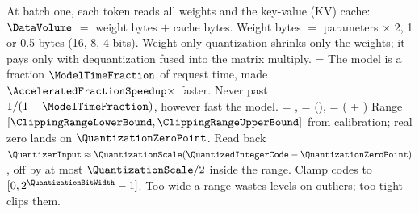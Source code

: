 \documentclass{studysheet}
\begin{document}
\begin{rightcol}
\vspace{12pt}
%
  { \approx \frac{\DataVolume}{\Bandwidth}}%
  {At batch one, each token reads all weights and the key-value (KV) cache: $\DataVolume$ $=$ weight bytes
   $+$ cache bytes. Weight bytes $=$ parameters $\times$ 2, 1 or 0.5 bytes (16, 8, 4 bits).}%
  {Weight-only quantization shrinks only the weights; it pays only with dequantization fused into the matrix multiply.}{}
%
  { = }%
  {The model is a fraction $\ModelTimeFraction$ of request time, made $\AcceleratedFractionSpeedup\times$ faster.}%
  {Never past $1/(1-\ModelTimeFraction)$, however fast the model.}{}
%
  {\QuantizationScale = ,
   \quad \QuantizationZeroPoint = \Big(\frac{-\ClippingRangeLowerBound}{\QuantizationScale}\Big),
   \quad \QuantizedIntegerCode = \Big(\frac{\QuantizerInput}{\QuantizationScale} + \QuantizationZeroPoint\Big)}%
  {Range $[\ClippingRangeLowerBound, \ClippingRangeUpperBound]$ from calibration; real zero lands on
   $\QuantizationZeroPoint$. Read back $\QuantizerInput \approx \QuantizationScale(\QuantizedIntegerCode - \QuantizationZeroPoint)$,
   off by at most $\QuantizationScale/2$ inside the range.}%
  {Clamp codes to $[0, 2^{\QuantizationBitWidth}-1]$. Too wide a range wastes levels on outliers; too tight clips them.}{}
\end{rightcol}
\end{document}
